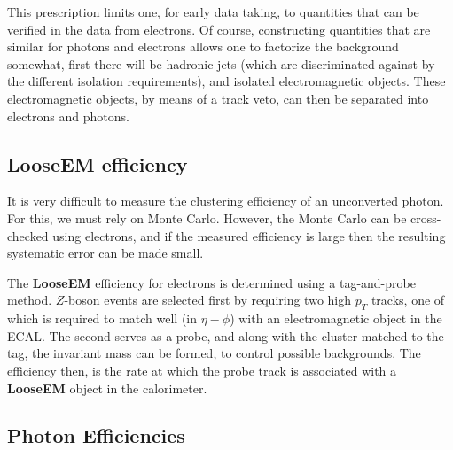 \documentclass{cmspaper}
\begin{document}
This prescription limits one, for early data taking, to quantities that can be verified in the data from electrons.  Of course, constructing quantities that are similar for photons and electrons allows one to factorize the background somewhat, first there will be hadronic jets (which are discriminated against by the different isolation requirements), and isolated electromagnetic objects.  These electromagnetic objects, by means of a track veto, can then be separated into electrons and photons. 
\subsection{LooseEM efficiency}\label{ssec:LooseEMEff}

It is very difficult to measure the clustering efficiency of an unconverted photon. For this, we must rely on Monte Carlo.
However, the Monte Carlo can be cross-checked using electrons, and if the measured efficiency is large then the resulting systematic 
error can be made small. 

The {\bf LooseEM} efficiency for electrons is determined using a tag-and-probe method.  $Z$-boson events are selected first by requiring two 
high $p_T$ tracks, one of which is required to match well (in $\eta-\phi$) with an electromagnetic object in the ECAL.  The second serves as a probe, 
and along with the cluster matched to the tag, the invariant mass can be formed, to control possible backgrounds.  The efficiency then, is the 
rate at which the probe track is associated with a {\bf LooseEM} object in the calorimeter.

\subsection{Photon Efficiencies}
\end{document}
